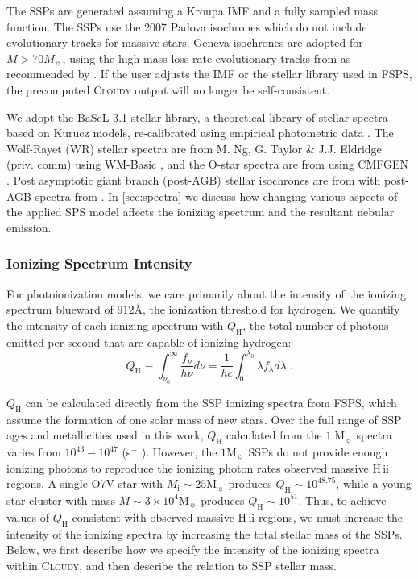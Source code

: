 \documentclass[linenumbers, trackchanges, tighten]{aastex61}%
\newcommand{\Sec}[1]{\autoref{sec:#1}}
\newcommand{\FSPS}{{\sc FSPS}\xspace}
\newcommand{\Cloudy}{\textsc{Cloudy}\xspace}
\newcommand\Msun{\ensuremath{\mathrm{M_{\sun}}}}
\newcommand{\hii}{H\,{\sc ii}\xspace}
\newcommand{\ang}{\ensuremath{\mbox{\AA}}}
\newcommand{\QH}{\ensuremath{Q_{\mathrm{H}}}}
\begin{document}
The SSPs are generated assuming a Kroupa IMF \citep{Kroupa01} and a fully sampled mass function. The SSPs use the 2007 Padova isochrones \citep{Bertelli94, Girardi00, Marigo08} which do not include evolutionary tracks for massive stars. Geneva isochrones are adopted for $M > 70 M_{\sun}$, using the high mass-loss rate evolutionary tracks from \citep{Schaller92, Meynet00} as recommended by \citet{Levesque10}. If the user adjusts the IMF or the stellar library used in \FSPS, the precomputed \Cloudy output will no longer be self-consistent.

We adopt the BaSeL 3.1 stellar library, a theoretical library of stellar spectra based on Kurucz models, re-calibrated using empirical photometric data \citep{BaSeL}. The Wolf-Rayet (WR) stellar spectra are from M. Ng, G. Taylor \& J.J. Eldridge (priv. comm) using WM-Basic \citep{Pauldrach01}, and the O-star spectra are from \citet{Smith02} using CMFGEN \citep{HillierMiller}. Post asymptotic giant branch (post-AGB) stellar isochrones are from \citet{Vassiliadis} with post-AGB spectra from \citet{Rauch03}. In \Sec{spectra} we discuss how changing various aspects of the applied SPS model affects the ionizing spectrum and the resultant nebular emission.
\newpage
\subsubsection{Ionizing Spectrum Intensity}\label{sec:methods:cloudy:intensity}

For photoionization models, we care primarily about the intensity of the ionizing spectrum blueward of $912 \ang$, the ionization threshold for hydrogen. We quantify the intensity of each ionizing spectrum with \QH{}, the total number of photons emitted per second that are capable of ionizing hydrogen:
\begin{equation}\label{eq:Q}
    \QH{} \equiv \int_{\nu_0}^{\infty}\frac{f_{\nu}}{h \nu} d\nu = \frac{1}{hc} \int_0^{\lambda_0}\lambda f_{\lambda}d\lambda\;.
\end{equation}

\QH{} can be calculated directly from the SSP ionizing spectra from \FSPS, which assume the formation of one solar mass of new stars. Over the full range of SSP ages and metallicities used in this work, \QH{} calculated from the $1\;\Msun{}$ spectra varies from $10^{43} - 10^{47}$ (s$^{-1}$). However, the $1\Msun$ SSPs do not provide enough ionizing photons to reproduce the ionizing photon rates observed massive \hii regions. A single O7V star with $M_{\mathrm{i}} \sim 25 \Msun$ produces $\QH \sim 10^{48.75}$, while a young star cluster with mass $M \sim 3 \times 10^4 \Msun$ produces $\QH{} \sim 10^{51}$. Thus, to achieve values of \QH{} consistent with observed massive \hii regions, we must increase the intensity of the ionizing spectra by increasing the total stellar mass of the SSPs. Below, we first describe how we specify the intensity of the ionizing spectra within \Cloudy, and then describe the relation to SSP stellar mass.
\end{document}
